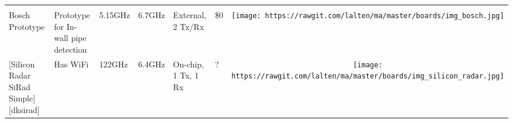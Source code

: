 \begin{longtable}[]{@{}llllllc@{}}
\begin{minipage}[t]{0.10\columnwidth}
\end{minipage}\tabularnewline
\begin{minipage}[t]{0.09\columnwidth}\raggedright\strut
Bosch Prototype\strut
\end{minipage} & \begin{minipage}[t]{0.13\columnwidth}\raggedright\strut
Prototype for In-wall pipe detection\strut
\end{minipage} & \begin{minipage}[t]{0.09\columnwidth}\raggedright\strut
5.15GHz\strut
\end{minipage} & \begin{minipage}[t]{0.11\columnwidth}\raggedright\strut
6.7GHz\strut
\end{minipage} & \begin{minipage}[t]{0.10\columnwidth}\raggedright\strut
External, 2 Tx/Rx\strut
\end{minipage} & \begin{minipage}[t]{0.15\columnwidth}\raggedright\strut
\$0\strut
\end{minipage} & \begin{minipage}[t]{0.10\columnwidth}\centering\strut
\texttt{[image: https://rawgit.com/lalten/ma/master/boards/img\_bosch.jpg]}\strut
\end{minipage}\tabularnewline
\begin{minipage}[t]{0.09\columnwidth}\raggedright\strut
{[}Silicon Radar SiRad Simple{]}{[}dksirad{]}\strut
\end{minipage} & \begin{minipage}[t]{0.13\columnwidth}\raggedright\strut
Has WiFi\strut
\end{minipage} & \begin{minipage}[t]{0.09\columnwidth}\raggedright\strut
122GHz\strut
\end{minipage} & \begin{minipage}[t]{0.11\columnwidth}\raggedright\strut
6.4GHz\strut
\end{minipage} & \begin{minipage}[t]{0.10\columnwidth}\raggedright\strut
On-chip, 1 Tx, 1 Rx\strut
\end{minipage} & \begin{minipage}[t]{0.15\columnwidth}\raggedright\strut
?\strut
\end{minipage} & \begin{minipage}[t]{0.10\columnwidth}\centering\strut
\texttt{[image: https://rawgit.com/lalten/ma/master/boards/img\_silicon\_radar.jpg]}

\end{minipage}
\end{longtable}
